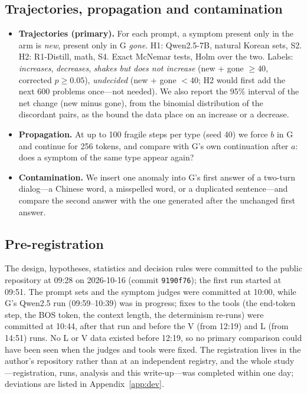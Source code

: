 \documentclass[11pt]{article}
\begin{document}
\subsection{Trajectories, propagation and contamination}\label{sec:traj-method}

\begin{itemize}
\item \textbf{Trajectories (primary).} For each prompt, a symptom present only in the arm is \emph{new}, present only in G
      \emph{gone}. H1: Qwen2.5-7B, natural Korean sets, S2. H2: R1-Distill, math, S4. Exact McNemar tests, Holm over the
      two. Labels: \emph{increases}, \emph{decreases}, \emph{shakes but does not increase} (new + gone $\ge 40$, corrected
      $p\ge 0.05$), \emph{undecided} (new + gone $<40$; H2 would first add the next 600 problems once---not needed). We
      also report the 95\% interval of the net change (new minus gone), from the binomial distribution of the discordant
      pairs, as the bound the data place on an increase or a decrease.
\item \textbf{Propagation.} At up to 100 fragile steps per type (seed 40) we force $b$ in G and continue for 256 tokens, and
      compare with G's own continuation after $a$: does a symptom of the same type appear again?
\item \textbf{Contamination.} We insert one anomaly into G's first answer of a two-turn dialog---a Chinese word, a
      misspelled word, or a duplicated sentence---and compare the second answer with the one generated after the unchanged
      first answer.
\end{itemize}

\subsection{Pre-registration}\label{sec:prereg}

The design, hypotheses, statistics and decision rules were committed to the public repository at 09:28 on 2026-10-16 (commit
\texttt{9190f76}); the first run started at 09:51. The prompt sets and the symptom judges were committed at 10:00, while G's
Qwen2.5 run (09:59--10:39) was in progress; fixes to the tools (the end-token step, the BOS token, the context length, the
determinism re-runs) were committed at 10:44, after that run and before the V (from 12:19) and L (from 14:51) runs. No L or V
data existed before 12:19, so no primary comparison could have been seen when the judges and tools were fixed. The
registration lives in the author's repository rather than at an independent registry, and the whole study---registration,
runs, analysis and this write-up---was completed within one day; deviations are listed in Appendix~\ref{app:dev}.
\end{document}
